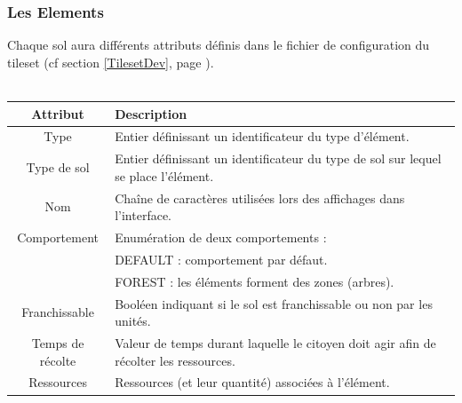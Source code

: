\documentclass[a4paper]{article}
\newcommand{\alinea}{\hspace*{0.5cm}}
\begin{document}
        \subsubsection{Les Elements}
          \alinea Chaque sol aura différents attributs définis dans le fichier de configuration du tileset (cf section \ref{TilesetDev}, page \pageref{TilesetDev}).\\
          \\
	  	  \begin{small}
			\begin{tabular}{| c | l |}
			  \hline
			  \textbf{Attribut} & \textbf{Description}\\
			  \hline
			  Type & Entier définissant un identificateur du type d'élément.\\
			  \hline
			  Type de sol & Entier définissant un identificateur du type de sol sur lequel se place l'élément.\\
			  \hline
			  Nom & Chaîne de caractères utilisées lors des affichages dans l'interface.\\
			  \hline
			  Comportement & Enumération de deux comportements :\\
			  & DEFAULT : comportement par défaut.\\
			  & FOREST : les éléments forment des zones (arbres).\\
			  \hline
			  Franchissable & Booléen indiquant si le sol est franchissable ou non par les unités.\\
			  \hline
			  Temps de récolte & Valeur de temps durant laquelle le citoyen doit agir afin de récolter les ressources.\\
			  \hline
			  Ressources & Ressources (et leur quantité) associées à l'élément.\\
			  \hline
			\end{tabular}
		  \end{small}
          
          
\end{document}
